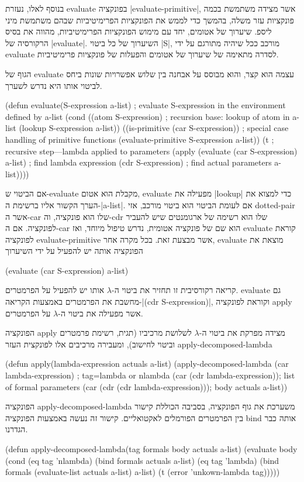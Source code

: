 בנוסף לאלו, נעזרת evaluate בפונקציה \E|evaluate-primitive|, אשר מצידה משתמשת
בכמה פונקציות עזר משלה, בהמשך כדי לממש את הפונקציות הפרימיטיביות שבהם משתמשת
מיני ליספ. שיערוך של אטומים, יחד עם מימוש הפונקציות הפרימיטיביות, מהווה את
בסיס הרקורסיה של \E|evaluate|. השיערוך של כל ביטוי \E|S|, מורכב ככל שיהיה
מתורגם על ידי evaluate לסדרה מתאימה של שיערוך של אטומים והפעלות של פונקציות
פרימיטיביות.

הגוף של evaluate עצמה הוא קצר, והוא מבוסס על אבחנה בין שלוש אפשרויות שונות ביחס
לביטוי אותו היא נדרש לשערך.

\minipage\textwidth
\begin{KERNEL}
(defun evaluate(S-expression a-list) ; evaluate S-expression in the environment defined by a-list
  (cond ((atom S-expression) ; recursion base: lookup of atom in a-list
          (lookup S-expression a-list))
        ((is-primitive (car S-expression)) ; special case handling of primitive functions
          (evaluate-primitive S-expression a-list))
        (t ; recursive step---lambda applied to parameters
          (apply (evaluate (car S-expression) a-list) ; find lambda expression
                  (cdr S-expression) ; find actual parameters
                  a-list))))
\end{KERNEL}
\endminipage

אם הביטוי ש-evaluate מקבלת הוא אטום, evaluate מפעילה את \E|lookup| כדי למצוא את
הערך הקשור אליו ברשימת ה-\E|a-list|. אם לעומת הביטוי הוא ביטוי מורכב, אזי
dotted-pair אשר ה-car שלו הוא פונקציה, וה-cdr שלו הוא רשימה של
ארגומנטים שיש להעביר לפונקציה. אם ה-car הוא שם של פונקציה אטומית, נדרש טיפול
מיוחד, ואז evaluate קוראת לפונקציה evaluate-primitive אשר מבצעת זאת.
בכל מקרה אחר, evaluate מוצאת את הפונקציה אותה יש להפעיל על ידי השיערוך
\begin{LISP}
(evaluate (car S-expression) a-list)
\end{LISP}
קריאה רקורסיבית זו תחזיר את ביטוי ה-$λ$ אותו יש להפעיל על הפרמטרים. evaluate
גם מחשבת את הפרמטרים באמצעות הקריאה-\T|(cdr S-expression)|, וקוראת לפונקציה
apply אשר מפעילה את ביטוי ה-$λ$ על הפרמטרים.

הפונקציה apply מצידה מפרקת את ביטוי ה-$λ$ לשלושת מרכיביו (תגית, רשימת פרמטרים
וביטוי לחישוב), ומעבירה מרכיבים אלו לפונקצית העזר apply-decomposed-lambda
\begin{KERNEL}
(defun apply(lambda-expression actuals a-list)
  (apply-decomposed-lambda
    (car lambda-expression) ; tag=lambda or nlambda
    (car (cdr lambda-expression)); list of formal parameters
    (car (cdr (cdr lambda-expression))); body
    actuals
    a-list))
\end{KERNEL}
הפונקציה apply-decomposed-lambda משערכת את גוף הפונקציה, בסביבה הכוללת קישור בין
הפרמטרים הפורמלים לאקטואליים. קישור זה נעשה באמצעות הפונקציה bind אותה כבר
הגדרנו.
\begin{KERNEL}
(defun apply-decomposed-lambda(tag formals body actuals a-list)
  (evaluate body
    (cond (eq tag 'nlambda) (bind formals actuals a-list)
          (eq tag 'lambda) (bind formals (evaluate-list actuals a-list) a-list)
          (t (error 'unkown-lambda tag)))))
\end{KERNEL}

